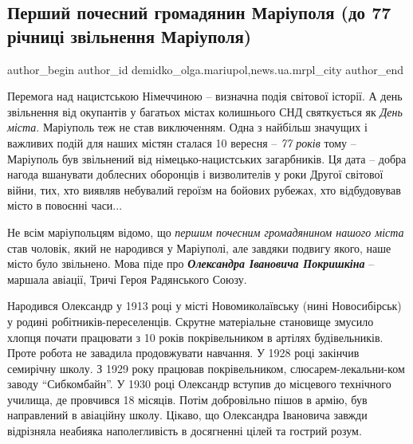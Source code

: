  
 
 
 
 
 
\subsection{Перший почесний громадянин Маріуполя (до 77 річниці звільнення Маріуполя)}
\label{sec:08_09_2020.stz.news.ua.mrpl_city.1.pershyj_pochesnyj_gromadjanyn_mrpl_pokryshkin}
 
\ifcmt
 author_begin
   author_id demidko_olga.mariupol,news.ua.mrpl_city
 author_end
\fi


Перемога над нацистською Німеччиною – визначна подія світової історії. А день
звільнення від окупантів у багатьох містах колишнього СНД святкується як \emph{День
міста}. Маріуполь теж не став виключенням. Одна з найбільш значущих і важливих
подій для наших містян сталася 10 вересня – \emph{77 років} тому – Маріуполь був
звільнений від німецько-нацистських  загарбників. Ця дата – добра нагода
вшанувати доблесних оборонців і визволителів у роки Другої світової війни, тих,
хто виявляв небувалий героїзм на бойових рубежах, хто відбудовував місто в
повоєнні часи...

Не всім маріупольцям відомо, що \emph{першим почесним громадянином нашого міста} став
чоловік, який не народився у Маріуполі, але завдяки подвигу якого, наше місто
було звільнено. Мова піде про \emph{\textbf{Олександра Івановича Покришкіна}} – маршала
авіації, Тричі Героя Радянського Союзу.

Народився Олександр у 1913 році у місті Новомиколаївську (нині Новосибірськ) у
родині робітників-переселенців. Скрутне матеріальне становище змусило хлопця
почати працювати з 10 років покрівельником в артілях будівельників. Проте
робота не завадила продовжувати навчання. У 1928 році закінчив семирічну школу.
З 1929 року працював покрівельником, слюсарем-лекальни\hyp{}ком заводу \enquote{Сибкомбайн}.
У 1930 році Олександр вступив до місцевого технічного училища, де провчився 18
місяців. Потім добровільно пішов в армію, був направлений в авіаційну школу.
Цікаво, що Олександра Івановича завжди відрізняла неабияка наполегливість в
досягненні цілей та  гострий розум.

